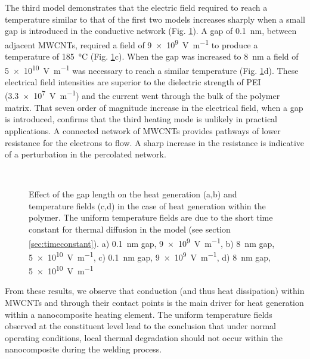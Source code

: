 The third model demonstrates that the electric field required to reach a temperature similar to that of the first two models increases sharply when a small gap is introduced in the conductive network (Fig. \ref{fig:result_gap}). 
A gap of \SI{0.1}{\nano\metre}, between adjacent MWCNTs, required a field of \SI{9e9}{\volt\per\metre} to produce a temperature of \SI{185}{\celsius} (Fig. \ref{fig:result_gap}c). 
When the gap was increased to \SI{8}{\nano\metre} a field of \SI{5e10}{\volt\per\metre} was necessary to reach a similar temperature (Fig. \ref{fig:result_gap}d). 
These electrical field intensities are superior to the dielectric strength of PEI (\SI{3.3e7}{\volt\per\metre}) and the current went through the bulk of the polymer matrix. 
That seven order of magnitude increase in the electrical field, when a gap is introduced, confirms that the third heating mode is unlikely in practical applications. 
A connected network of MWCNTs provides pathways of lower resistance for the electrons to flow. 
A sharp increase in the resistance is indicative of a perturbation in the percolated network. 




\begin{figure}[h!]
	\centering
	 \\
	\caption{Effect of the gap length on the heat generation (a,b) and temperature fields (c,d) in the case of heat generation within the polymer. The uniform temperature fields are due to the short time constant for thermal diffusion in the model (see section \ref{sec:timeconstant}).  a) \SI{0.1}{\nano\metre} gap, \SI{9e9}{\volt\per\metre}, b) \SI{8}{\nano\metre} gap, \SI{5e10}{\volt\per\metre}, c) \SI{0.1}{\nano\metre} gap, \SI{9e9}{\volt\per\metre}, d) \SI{8}{\nano\metre} gap, \SI{5e10}{\volt\per\metre} \cite{Brassard2018_figshare_article1}}
	\label{fig:result_gap}
\end{figure}

From these results, we observe that conduction (and thus heat dissipation) within MWCNTs and through their contact points is the main driver for heat generation within a nanocomposite heating element. 
The uniform temperature fields observed at the constituent level lead to the conclusion that under normal operating conditions, local thermal degradation should not occur within the nanocomposite during the welding process. 


